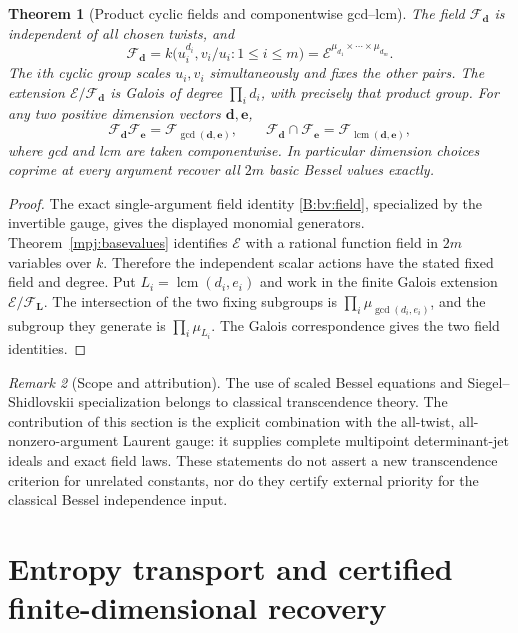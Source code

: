 \documentclass[11pt,a4paper]{article}
\newtheorem{theorem}{Theorem}[section]
\theoremstyle{definition}
\theoremstyle{remark}
\newtheorem{remark}[theorem]{Remark}
\numberwithin{equation}{section}
\begin{document}
\begin{theorem}[Product cyclic fields and componentwise gcd--lcm]
\label{mpj:fields}
The field $\mathcal F_{\mathbf d}$ is independent of all chosen
twists, and
\[
 \mathcal F_{\mathbf d}
 =k\bigl(u_i^{d_i},v_i/u_i:1\le i\le m\bigr)
 =\mathcal E^{\mu_{d_1}\times\cdots\times\mu_{d_m}}.
\]
The $i$th cyclic group scales $u_i,v_i$ simultaneously and fixes
the other pairs. The extension
$\mathcal E/\mathcal F_{\mathbf d}$ is Galois of degree
$\prod_i d_i$, with precisely that product group. For any two
positive dimension vectors $\mathbf d,\mathbf e$,
\[
 \mathcal F_{\mathbf d}\mathcal F_{\mathbf e}
       =\mathcal F_{\gcd(\mathbf d,\mathbf e)},\qquad
 \mathcal F_{\mathbf d}\cap\mathcal F_{\mathbf e}
       =\mathcal F_{\operatorname{lcm}(\mathbf d,\mathbf e)},
\]
where gcd and lcm are taken componentwise.
In particular dimension choices coprime at every argument recover
all $2m$ basic Bessel values exactly.
\end{theorem}
\begin{proof}
The exact single-argument field identity \eqref{B:bv:field},
specialized by the invertible gauge, gives the displayed
monomial generators. Theorem~\ref{mpj:basevalues} identifies
$\mathcal E$ with a rational function field in $2m$ variables
over $k$. Therefore the independent scalar actions have the
stated fixed field and degree. Put
$L_i=\operatorname{lcm}(d_i,e_i)$ and work in the finite Galois
extension $\mathcal E/\mathcal F_{\mathbf L}$.
The intersection of the two fixing subgroups is
$\prod_i\mu_{\gcd(d_i,e_i)}$, and the subgroup they generate
is $\prod_i\mu_{L_i}$. The Galois correspondence gives the two
field identities.
\end{proof}

\begin{remark}[Scope and attribution]
The use of scaled Bessel equations and Siegel--Shidlovskii
specialization belongs to classical transcendence theory. The
contribution of this section is the explicit combination with the
all-twist, all-nonzero-argument Laurent gauge: it supplies complete
multipoint determinant-jet ideals and exact field laws. These
statements do not assert a new transcendence criterion for unrelated
constants, nor do they certify external priority for the classical
Bessel independence input.
\end{remark}


\clearpage\part{Entropy transport and certified finite-dimensional recovery}
\end{document}
